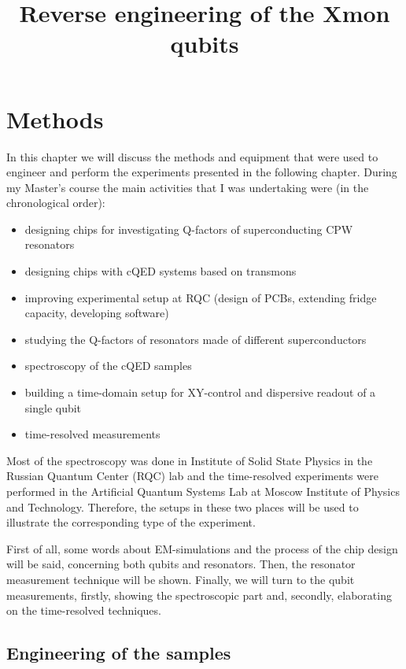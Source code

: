 \documentclass[12pt, twoside]{report}
\title{Reverse engineering of the Xmon qubits}
\numberwithin{equation}{section}
\begin{document}
\maketitle
\tableofcontents

%


%

\chapter{Methods}

In this chapter we will discuss the methods and equipment that were used to engineer and perform the experiments presented in the following chapter. During my Master's course the main activities that I was undertaking were (in the chronological order):
\begin{itemize}
\item designing chips for investigating Q-factors of superconducting CPW resonators
\item designing chips with cQED systems based on transmons
\item improving experimental setup at RQC (design of PCBs, extending fridge capacity, developing software)
\item studying the Q-factors of resonators made of different superconductors
\item spectroscopy of the cQED samples
\item building a time-domain setup for XY-control and dispersive readout of a single qubit
\item time-resolved measurements
\end{itemize}  

Most of the spectroscopy was done in Institute of Solid State Physics in the Russian Quantum Center (RQC) lab and the time-resolved experiments were performed in the Artificial Quantum Systems Lab at Moscow Institute of Physics and Technology. Therefore, the setups in these two places will be used to illustrate the corresponding type of the experiment. 

First of all, some words about EM-simulations and the process of the chip design will be said, concerning both qubits and resonators. Then, the resonator measurement technique will be shown. Finally, we will turn to the qubit measurements, firstly, showing the spectroscopic part and, secondly, elaborating on the time-resolved techniques.

\section{Engineering of the samples}
\end{document}
